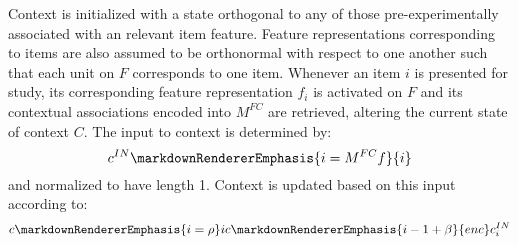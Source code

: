 {}Context is initialized with a state orthogonal to any of those pre-experimentally associated with an relevant item feature. Feature representations corresponding to items are also assumed to be orthonormal with respect to one another such that each unit on $F$ corresponds to one item.\markdownRendererInterblockSeparator
{}\markdownRendererInterblockSeparator
{}Whenever an item $i$ is presented for study, its corresponding feature representation $f_i$ is activated on $F$ and its contextual associations encoded into $M^{FC}$ are retrieved, altering the current state of context $C$.\markdownRendererInterblockSeparator
{}The input to context is determined by:\markdownRendererInterblockSeparator
{}$$c^{IN}\markdownRendererEmphasis{{i} = M^{FC}f}{i}$$\markdownRendererInterblockSeparator
{}and normalized to have length 1. Context is updated based on this input according to:\markdownRendererInterblockSeparator
{}$$c\markdownRendererEmphasis{i = \rho}ic\markdownRendererEmphasis{{i-1} + \beta}{enc} c_{i}^{IN}$$\relax
